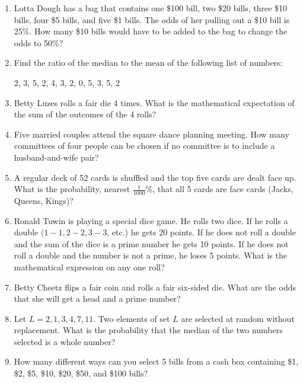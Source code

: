 \documentclass[../uilmath.tex]{subfiles}
\begin{document}
\begin{enumerate}[label=\bfseries\arabic*.]
    \item %
    Lotta Dough has a bag that contains one \$100 bill, two \$20 bills, three \$10 bills, four \$5 bills, and five \$1 bills. The odds of her pulling out a \$10 bill is 25\%. How many 
    \$10 bills would have to be added to the bag to change the odds to 50\%?

    \item %
    Find the ratio of the median to the mean of the following list of numbers:
    \begin{center}
        2, 3, 5, 2, 4, 3, 2, 0, 5, 3, 5, 2
    \end{center}

    \item %
    Betty Luzes rolls a fair die 4 times. What is the mathematical expectation of the sum of the outcomes of the 4 rolls?

    \item %
    Five married couples attend the square dance planning meeting. How many committees of four people can be chosen if no committee is to include a husband-and-wife pair?

    \item %
    A regular deck of 52 cards is shuffled and the top five cards are dealt face up. What is the probability, nearest $\frac{1}{1000}$\%, that all 5 cards are face cards (Jacks, Queens, Kings)?

    \item %
    Ronald Tuwin is playing a special dice game. He rolls two dice. If he rolls a double $(1-1, 2-2,3-3$, etc.) he gets 20 points.
    If he does not roll a double and the sum of the dice is a prime number he gets 10 points. If he does not roll a double and the number is not a prime, he loses 5 points.
    What is the mathematical expression on any one roll?

    \item %
    Betty Cheetz flips a fair coin and rolls a fair six-sided die. What are the odds that she will get a head and a prime number?

    \item %
    Let $L={2,1,3,4,7,11}$. Two elements of set $L$ are selected at random without replacement.
    What is the probability that the median of the two numbers selected is a whole number?

    \item %
    How many different ways can you select 5 bills from a cash box containing \$1, \$2, \$5, \$10, \$20, \$50, and \$100 bills?


\end{enumerate}
\end{document}
